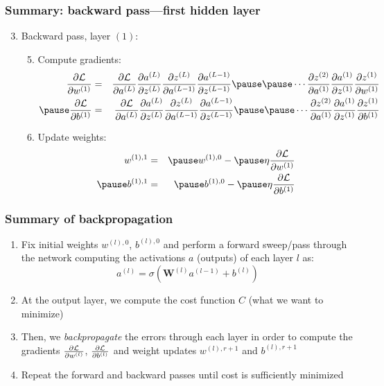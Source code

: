 \documentclass[smaller]{beamer}
\begin{document}
\begin{frame}
  \frametitle{Summary: backward pass---first hidden layer}
  \begin{enumerate}[<+->]\setcounter{enumi}{2}
  \item Backward pass, layer $(1)$:\pause
        \begin{enumerate}[<+->] \setcounter{enumii}{4}
    \item Compute gradients: \pause
    \begin{eqnarray}
      \pd{\mc{L}}{w^{(1)}} &=&  \pd{\mc{L}}{a^{(L)}}\pd{a^{(L)}}{z^{(L)}}\pd{z^{(L)}}{a^{(L-1)}}\pd{a^{(L-1)}}{z^{(L-1)}} \pause
                          \pause\cdots  
                          \pd{z^{(2)}}{a^{(1)}}                          
                        \pd{a^{(1)}}{z^{(1)}}\pd{z^{(1)}}{w^{(1)}}\\\pause
      \pd{\mc{L}}{b^{(1)}} &=&  \pd{\mc{L}}{a^{(L)}}\pd{a^{(L)}}{z^{(L)}}\pd{z^{(L)}}{a^{(L-1)}}\pd{a^{(L-1)}}{z^{(L-1)}} \pause
                          \pause\cdots  
                          \pd{z^{(2)}}{a^{(1)}}                          
                        \pd{a^{(1)}}{z^{(1)}}\pd{z^{(1)}}{b^{(1)}}
    \end{eqnarray}
    \pause
  \item Update weights: \pause
    \begin{eqnarray}
      w^{(1), 1}  &=& \pause  w^{(1),0} - \pause \eta \pd{\mc{L}}{w^{(1)}}  \\\pause
      b^{(1), 1}  &=&  \pause b^{(1),0} - \pause \eta \pd{\mc{L}}{b^{(1)}}  
    \end{eqnarray}
  \end{enumerate}
  \end{enumerate}
\end{frame}


\begin{frame}
  \frametitle{Summary of backpropagation}\pause

  \begin{enumerate}[<+->]
  \item Fix initial weights $w^{(l),0}$, $b^{(l),0}$ and perform a forward sweep/pass through the network computing the activations $a$ (outputs) of each layer $l$ as:\pause
    \begin{equation}
      a^{(l)} = \sigma(\bm W^{(l)} a^{(l-1)} + b^{(l)})
    \end{equation}
  \item At the output layer, we compute the cost function $C$ (what we want to minimize)
  \item Then, we {\it backpropagate} the errors through each layer in order to compute the gradients $\frac{\partial{\mathcal{L}}}{\partial{w^{(l)}}}$, $\frac{\partial{\mathcal{L}}}{\partial{b^{(l)}}}$ \pause
    and  weight updates  $w^{(l),r+1}$ and $b^{(l),r+1}$
\item Repeat the forward and backward passes until cost is sufficiently minimized
  \end{enumerate}
  
\end{frame}
\end{document}
